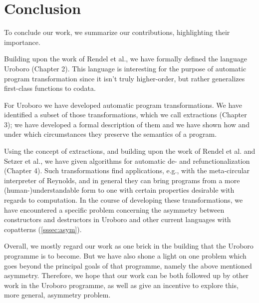 \chapter{Conclusion}

To conclude our work, we summarize our contributions, highlighting their importance.

Building upon the work of Rendel et al., we have formally defined the language Uroboro (Chapter 2). This language is interesting for the purpose of automatic program transformation since it isn't truly higher-order, but rather generalizes first-class functions to codata.

For Uroboro we have developed automatic program transformations. We have identified a subset of those transformations, which we call extractions (Chapter 3); we have developed a formal description of them and we have shown how and under which circumstances they preserve the semantics of a program.

Using the concept of extractions, and building upon the work of Rendel et al. and Setzer et al., we have given algorithms for automatic de- and refunctionalization (Chapter 4). Such transformations find applications, e.g., with the meta-circular interpreter of Reynolds, and in general they can bring programs from a more (human-)understandable form to one with certain properties desirable with regards to computation. In the course of developing these transformations, we have encountered a specific problem concerning the asymmetry between constructors and destructors in Uroboro and other current languages with copatterns (\autoref{sssec:asym}).

Overall, we mostly regard our work as one brick in the building that the Uroboro programme is to become. But we have also shone a light on one problem which goes beyond the principal goals of that programme, namely the above mentioned asymmetry. Therefore, we hope that our work can be both followed up by other work in the Uroboro programme, as well as give an incentive to explore this, more general, asymmetry problem.